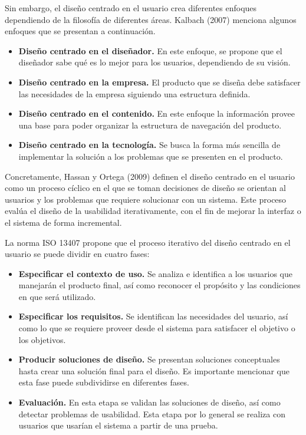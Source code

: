 Sin embargo, el diseño centrado en el usuario crea diferentes enfoques dependiendo de la filosofía de diferentes áreas. Kalbach (2007) menciona algunos enfoques que se presentan a continuación.

\begin{itemize}
  \item \textbf{Diseño centrado en el diseñador.} En este enfoque, se propone que el diseñador sabe qué es lo mejor para los usuarios, dependiendo de su visión.
  \item \textbf{Diseño centrado en la empresa.} El producto que se diseña debe satisfacer las necesidades de la empresa siguiendo una estructura definida.
  \item \textbf{Diseño centrado en el contenido.} En este enfoque la información provee una base para poder organizar la estructura de navegación del producto.
  \item \textbf{Diseño centrado en la tecnología.} Se busca la forma más sencilla de implementar la solución a los problemas que se presenten en el producto.
\end{itemize}

Concretamente, Hassan y Ortega (2009) definen el diseño centrado en el usuario como un proceso cíclico en el que se toman decisiones de diseño se orientan al usuarios y los problemas que requiere solucionar con un sistema. Este proceso evalúa el diseño de la usabilidad iterativamente, con el fin de mejorar la interfaz o el sistema de forma incremental.

La norma ISO 13407 propone que el proceso iterativo del diseño centrado en el usuario se puede dividir en cuatro fases:

\begin{itemize}
  \item \textbf{Especificar el contexto de uso.} Se analiza e identifica a los usuarios que manejarán el producto final, así como reconocer el propósito y las condiciones en que será utilizado.
  \item \textbf{Especificar los requisitos.} Se identifican las necesidades del usuario, así como lo que se requiere proveer desde el sistema para satisfacer el objetivo o los objetivos.
  \item \textbf{Producir soluciones de diseño.} Se presentan soluciones conceptuales hasta crear una solución final para el diseño. Es importante mencionar que esta fase puede subdividirse en diferentes fases.
  \item \textbf{Evaluación.} En esta etapa se validan las soluciones de diseño, así como detectar problemas de usabilidad. Esta etapa por lo general se realiza con usuarios que usarían el sistema a partir de una prueba.
\end{itemize}

